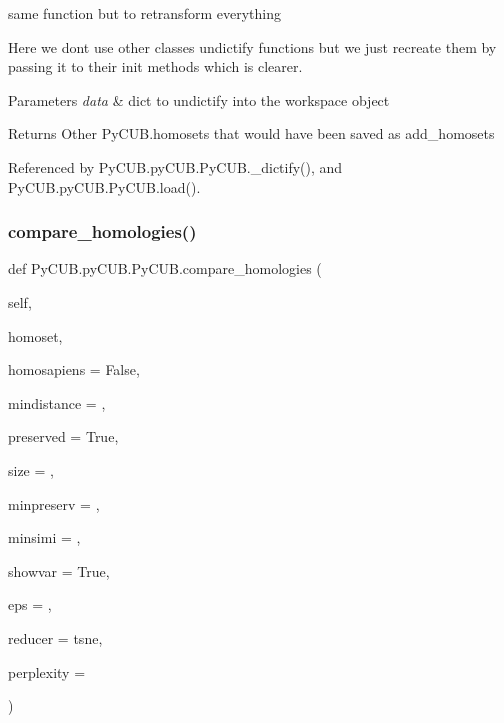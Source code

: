 same function but to retransform everything 

Here we don\textquotesingle{}t use other classes undictify functions but we just recreate them by passing it to their init methods which is clearer.


\begin{DoxyParams}{Parameters}
{\em data} & dict to undictify into the workspace object\\
\hline
\end{DoxyParams}
\begin{DoxyReturn}{Returns}
Other Py\+C\+U\+B.\+homosets that would have been saved as add\+\_\+homosets 
\end{DoxyReturn}


Referenced by Py\+C\+U\+B.\+py\+C\+U\+B.\+Py\+C\+U\+B.\+\_\+dictify(), and Py\+C\+U\+B.\+py\+C\+U\+B.\+Py\+C\+U\+B.\+load().

\mbox{\label{class_py_c_u_b_1_1py_c_u_b_1_1_py_c_u_b_ad350376cd68d4daacec78c694ed754c6}} 
\subsubsection{\texorpdfstring{compare\+\_\+homologies()}{compare\_homologies()}}
{\footnotesize\ttfamily def Py\+C\+U\+B.\+py\+C\+U\+B.\+Py\+C\+U\+B.\+compare\+\_\+homologies (\begin{DoxyParamCaption}\item[{}]{self,  }\item[{}]{homoset,  }\item[{}]{homosapiens = {\ttfamily False},  }\item[{}]{mindistance = {},  }\item[{}]{preserved = {\ttfamily True},  }\item[{}]{size = {},  }\item[{}]{minpreserv = {},  }\item[{}]{minsimi = {},  }\item[{}]{showvar = {\ttfamily True},  }\item[{}]{eps = {},  }\item[{}]{reducer = {\ttfamily \textquotesingle{}tsne\textquotesingle{}},  }\item[{}]{perplexity = {} }\end{DoxyParamCaption})}



